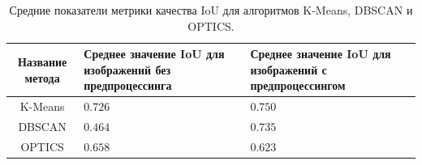 \documentclass{article}
\begin{document}
\begin{enumerate}
\begin{table}[H]
\centering
\caption{\label{tab:canonsummary} Средние показатели метрики качества IoU для алгоритмов K-Means, DBSCAN и OPTICS.}
\begin{tabular}{|c|p{4cm}|p{4cm}|}
\hline
Название метода & Среднее значение IoU для изображений без предпроцессинга & Среднее значение IoU для изображений с предпроцессингом \\
\hline
K-Means & $0.726$ & $0.750$\\
DBSCAN & $0.464$ & $0.735$ \\
OPTICS & $0.658$ & $0.623$\\
\hline
\end{tabular}
\end{table}


\end{enumerate}
\end{document}
